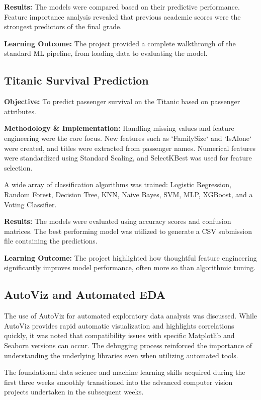 \textbf{Results:} The models were compared based on their predictive performance. Feature importance analysis revealed that previous academic scores were the strongest predictors of the final grade.

\textbf{Learning Outcome:} The project provided a complete walkthrough of the standard ML pipeline, from loading data to evaluating the model.

\subsection{Titanic Survival Prediction}

\textbf{Objective:} To predict passenger survival on the Titanic based on passenger attributes.

\textbf{Methodology \& Implementation:}
Handling missing values and feature engineering were the core focus. New features such as `FamilySize` and `IsAlone` were created, and titles were extracted from passenger names. Numerical features were standardized using Standard Scaling, and SelectKBest was used for feature selection.

A wide array of classification algorithms was trained: Logistic Regression, Random Forest, Decision Tree, KNN, Naive Bayes, SVM, MLP, XGBoost, and a Voting Classifier.

\textbf{Results:} The models were evaluated using accuracy scores and confusion matrices. The best performing model was utilized to generate a CSV submission file containing the predictions.

\textbf{Learning Outcome:} The project highlighted how thoughtful feature engineering significantly improves model performance, often more so than algorithmic tuning.

\subsection{AutoViz and Automated EDA}

The use of AutoViz for automated exploratory data analysis was discussed. While AutoViz provides rapid automatic visualization and highlights correlations quickly, it was noted that compatibility issues with specific Matplotlib and Seaborn versions can occur. The debugging process reinforced the importance of understanding the underlying libraries even when utilizing automated tools.

The foundational data science and machine learning skills acquired during the first three weeks smoothly transitioned into the advanced computer vision projects undertaken in the subsequent weeks.
